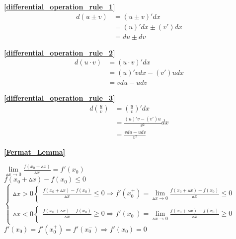 \textbf{\large \ref{differential_operation_rule_1}}
\begin{align*}
        d(u\pm v)&=(u\pm v)'dx\\
                &=(u)'dx \pm (v')dx\\
                &=du\pm dv
\end{align*}

\textbf{\large \ref{differential_operation_rule_2}}
\begin{align*}
        d(u\cdot v)&=(u\cdot v)'dx\\
                &=(u)'vdx - (v')udx\\
                &=vdu - udv
\end{align*}

\textbf{\large \ref{differential_operation_rule_3}}
\begin{align*}
        d\left(\frac{u}{v}\right)&=\left(\frac{u}{v}\right)'dx\\
                &=\frac{(u)'v - (v')u}{v^2}dx\\
                &=\frac{vdu - udv}{v^2}
\end{align*}

\textbf{\large \ref{Fermat_Lemma}}
\begin{center}
    $\lim\limits_{\vartriangle x\to 0}\frac{f(x_0+\vartriangle x)}{\vartriangle x}=f'(x_0)$\\
    $f(x_0+\vartriangle x)-f(x_0)\leqslant 0$\\
    $\begin{cases}
        \vartriangle x>0\begin{cases}
            \frac{f(x_0+\vartriangle x)-f(x_0)}{\vartriangle x}\leqslant 0\Rightarrow f'(x_0^+) =\lim\limits_{\vartriangle x \to 0}\frac{f(x_0+\vartriangle x)-f(x_0)}{\vartriangle x}\leqslant 0
        \end{cases}\\
        \vartriangle x<0\begin{cases}
            \frac{f(x_0+\vartriangle x)-f(x_0)}{\vartriangle x}\geqslant 0\Rightarrow f'(x_0^-) =\lim\limits_{\vartriangle x \to 0}\frac{f(x_0+\vartriangle x)-f(x_0)}{\vartriangle x}\geqslant 0
        \end{cases}
    \end{cases}$\\
    $f'(x_0)=f'(x_0^+)=f'(x_0^-)\Rightarrow f'(x_0)= 0$
\end{center}

